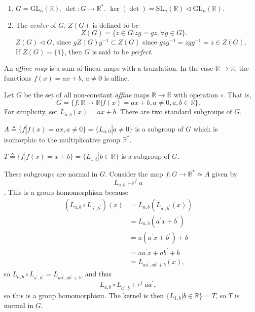 \documentclass{article}
\begin{document}
\begin{xmpl}
\begin{enumerate}
  \item{$G = \mathrm{\mathrm{GL}}_n(\mathbb{R})$, $\det : G \to \mathbb{R}^\ast$.
        $\ker(\det) = \mathrm{SL}_n(\mathbb{R}) 
                    \triangleleft \mathrm{\mathrm{GL}}_n(\mathbb{R})$.
       }
  \item{The \emph{center} of $G$, $Z(G)$ is defined to be
        $$
        Z(G) = \{ z \in G | z g = g z, \forall g \in G \}.
        $$
        $Z(G) \triangleleft G$, since $g Z(G) g^{-1} \subset Z(G)$
        since $g z g^{-1} = z g g^{-1} = z \in Z(G)$. If 
        $Z(G) = \{1\}$, then $G$ is said to be \emph{perfect}.
        }
\end{enumerate}
\end{xmpl}


\begin{defn}
An \emph{affine map} is a sum of linear maps with a translation. In
the case $\mathbb{R} \to \mathbb{R}$, the functions $f(x) = ax + b$,
$a \neq 0$ is affine.
\end{defn}

\begin{xmpl}
Let $G$ be the set of all non-constant \emph{affine} maps 
$\mathbb{R} \to \mathbb{R}$ with operation $\circ$. That is,
$$
G = \{ f : \mathbb{R} \to \mathbb{R} | f(x) = ax + b, 
                                       a \neq 0,
                                       a, b \in \mathbb{R}
    \}.
$$
For simplicity, set $L_{a,b}(x) = ax + b$. There are two standard
subgroups of $G$. 

$A \triangleq \{ f | f(x) = ax, a \neq 0 \} = \{L_{a, 0} | a \neq 0\}$
is a subgroup of $G$ which is isomorphic to the multiplicative group
$\mathbb{R}^\ast$.

$T \triangleq \{ f | f(x) = x + b \} = \{ L_{1,b} | b \in \mathbb{R}
\}$ is a subgroup of $G$. 

These subgroups are normal in $G$. Consider the map 
$f : G \to \mathbb{R}^\ast \simeq A$ given by 
$$
L_{a,b} \mathrel{\mathop{\mapsto}^{f}} a
$$. 
This is a group homomorphism because
\begin{align*}
(L_{a,b} \circ L_{a^\prime, b^\prime})(x) 
 & = L_{a,b}(L_{a^\prime, b^\prime}(x)) \\
 & = L_{a,b}(a^\prime x + b^\prime) \\
 & = a(a^\prime x + b^\prime) + b \\
 & = aa^\prime x + ab^\prime + b \\
 & = L_{a a^\prime, a b^\prime + b}(x),
\end{align*}
so $L_{a,b} \circ L_{a^\prime, b^\prime} = L_{a a^\prime, a b^\prime +
  b}$, and thus
$$
L_{a,b} \circ L_{a^\prime, b^\prime} \mathrel{\mathop{\mapsto}^{f}} a a^\prime,
$$ 
so this is a group homomorphism. The kernel is then 
$\{L_{1,b} | b \in \mathbb{R} \} = T$, so $T$ is normal in $G$.
\end{xmpl}
\end{document}
